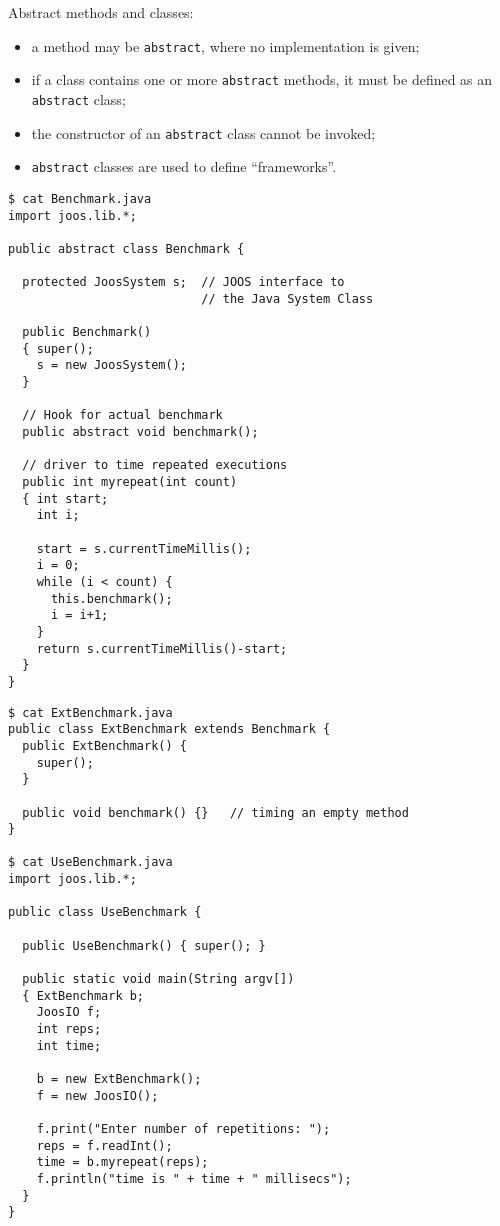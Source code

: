 \begin{slide*}
Abstract methods and classes:
\begin{itemize}
\item a method may be {\tt abstract}, where no implementation is given;
\item if a class contains one or more {\tt abstract} methods, it must be
               defined as an {\tt abstract} class;
\item the constructor of an {\tt abstract} class cannot be invoked;
\item {\tt abstract} classes are used to define ``frameworks''.
\end{itemize}
\vfil
\end{slide*}

\begin{slide*}
\begin{scriptsize}
\begin{verbatim}
$ cat Benchmark.java
import joos.lib.*;
 
public abstract class Benchmark {
 
  protected JoosSystem s;  // JOOS interface to 
                           // the Java System Class
 
  public Benchmark() 
  { super();
    s = new JoosSystem();
  }
 
  // Hook for actual benchmark
  public abstract void benchmark();  
 
  // driver to time repeated executions
  public int myrepeat(int count)     
  { int start;
    int i;
 
    start = s.currentTimeMillis();
    i = 0;
    while (i < count) { 
      this.benchmark();
      i = i+1;
    }
    return s.currentTimeMillis()-start;
  }
}
\end{verbatim}
\end{scriptsize}
\vfil
\end{slide*}

\begin{slide*}
\begin{scriptsize}
\begin{verbatim}
$ cat ExtBenchmark.java
public class ExtBenchmark extends Benchmark {
  public ExtBenchmark() {
    super();
  }
 
  public void benchmark() {}   // timing an empty method
}

$ cat UseBenchmark.java
import joos.lib.*;

public class UseBenchmark {
 
  public UseBenchmark() { super(); }
 
  public static void main(String argv[])
  { ExtBenchmark b;
    JoosIO f;
    int reps;
    int time;

    b = new ExtBenchmark();
    f = new JoosIO();

    f.print("Enter number of repetitions: ");
    reps = f.readInt();
    time = b.myrepeat(reps);
    f.println("time is " + time + " millisecs");
  }
}
\end{verbatim}
\end{scriptsize}
\vfil
\end{slide*}

